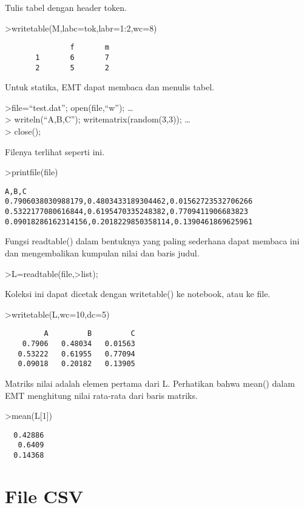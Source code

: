 \documentclass[
]{book}
\begin{document}
Tulis tabel dengan header token.

\textgreater writetable(M,labc=tok,labr=1:2,wc=8)

\begin{verbatim}
               f       m
       1       6       7
       2       5       2
\end{verbatim}

Untuk statika, EMT dapat membaca dan menulis tabel.

\textgreater file=``test.dat''; open(file,``w''); \ldots{}\\
\textgreater{} writeln(``A,B,C''); writematrix(random(3,3)); \ldots{}\\
\textgreater{} close();

Filenya terlihat seperti ini.

\textgreater printfile(file)

\begin{verbatim}
A,B,C
0.7906038030988179,0.4803433189304462,0.01562723532706266
0.5322177080616844,0.6195470335248382,0.7709411906683823
0.09018286162314156,0.2018229850358114,0.1390461869625961
\end{verbatim}

Fungsi readtable() dalam bentuknya yang paling sederhana dapat membaca ini dan mengembalikan kumpulan nilai dan baris judul.

\textgreater L=readtable(file,\textgreater list);

Koleksi ini dapat dicetak dengan writetable() ke notebook, atau ke file.

\textgreater writetable(L,wc=10,dc=5)

\begin{verbatim}
         A         B         C
    0.7906   0.48034   0.01563
   0.53222   0.61955   0.77094
   0.09018   0.20182   0.13905
\end{verbatim}

Matriks nilai adalah elemen pertama dari L. Perhatikan bahwa mean() dalam EMT menghitung nilai rata-rata dari baris matriks.

\textgreater mean(L{[}1{]})

\begin{verbatim}
  0.42886 
   0.6409 
  0.14368 
\end{verbatim}

\chapter{File CSV}\label{file-csv}
\end{document}
